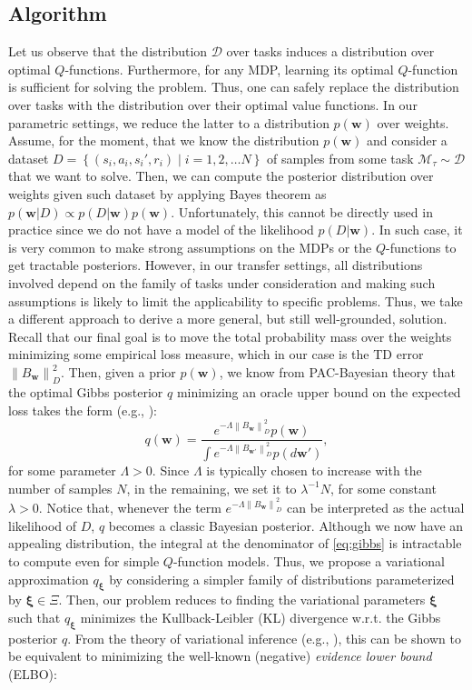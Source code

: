 \documentclass{article}
\newcommand{\norm}[1]{\left\lVert #1 \right\rVert}
\begin{document}
\subsection{Algorithm}\label{sec:alg}

Let us observe that the distribution $\mathcal{D}$ over tasks induces a distribution over optimal $Q$-functions. Furthermore, for any MDP, learning its optimal $Q$-function is sufficient for solving the problem. Thus, one can safely replace the distribution over tasks with the distribution over their optimal value functions. In our parametric settings, we reduce the latter to a distribution $p(\bm{w})$ over weights.\\ 
Assume, for the moment, that we know the distribution $p(\bm{w})$ and consider a dataset $D=\left\{(s_i,a_i,s_i',r_i) \mid i = 1,2,\dots N\right\}$ of samples from some task $\mathcal{M}_\tau \sim \mathcal{D}$ that we want to solve. Then, we can compute the posterior distribution over weights given such dataset by applying Bayes theorem as $p(\bm{w} | D) \propto p(D | \bm{w})p(\bm{w})$. Unfortunately, this cannot be directly used in practice since we do not have a model of the likelihood $p(D|\bm{w})$. In such case, it is very common to make strong assumptions on the MDPs or the $Q$-functions to get tractable posteriors. However, in our transfer settings, all distributions involved depend on the family of tasks under consideration and making such assumptions is likely to limit the applicability to specific problems. Thus, we take a different approach to derive a more general, but still well-grounded, solution. Recall that our final goal is to move the total probability mass over the weights minimizing some empirical loss measure, which in our case is the TD error $\norm{B_{\bm{w}}}_D^2$. Then, given a prior $p(\bm{w})$, we know from PAC-Bayesian theory that the optimal Gibbs posterior $q$ minimizing an oracle upper bound on the expected loss takes the form (e.g., \cite{catoni2007pac}):
\begin{equation}\label{eq:gibbs}
q(\bm{w}) = \frac{e^{-\Lambda\norm{B_{\bm{w}}}_D^2}p(\bm{w})}{\int e^{-\Lambda\norm{B_{\bm{w}'}}_D^2}p(d\bm{w}')},
\end{equation}
for some parameter $\Lambda > 0$. Since $\Lambda$ is typically chosen to increase with the number of samples $N$, in the remaining, we set it to $\lambda^{-1}N$, for some constant $\lambda > 0$. Notice that, whenever the term $e^{-\Lambda\norm{B_{\bm{w}}}_D^2}$ can be interpreted as the actual likelihood of $D$, $q$ becomes a classic Bayesian posterior. Although we now have an appealing distribution, the integral at the denominator of \eqref{eq:gibbs} is intractable to compute even for simple $Q$-function models. Thus, we propose a variational approximation $q_{\bm{\xi}}$ by considering a simpler family of distributions parameterized by $\bm{\xi} \in \Xi$. Then, our problem reduces to finding the variational parameters $\bm{\xi}$ such that $q_{\bm{\xi}}$ minimizes the Kullback-Leibler (KL) divergence w.r.t. the Gibbs posterior $q$. From the theory of variational inference (e.g., \cite{blei2017variational}), this can be shown to be equivalent to minimizing the well-known (negative) \textit{evidence lower bound} (ELBO):
\end{document}
